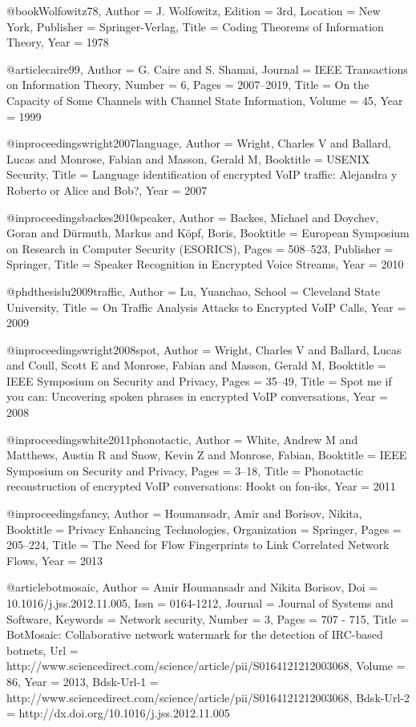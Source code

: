 {{{{{{{{{@book{Wolfowitz78,
	Author = {J. Wolfowitz},
	Edition = {3rd},
	Location = {New York},
	Publisher = {Springer-Verlag},
	Title = {Coding Theorems of Information Theory},
	Year = 1978}

@article{caire99,
	Author = {G. Caire and S. Shamai},
	Journal = {IEEE Transactions on Information Theory},
	Number = {6},
	Pages = {2007--2019},
	Title = {On the Capacity of Some Channels with Channel State Information},
	Volume = {45},
	Year = {1999}}

@inproceedings{wright2007language,
	Author = {Wright, Charles V and Ballard, Lucas and Monrose, Fabian and Masson, Gerald M},
	Booktitle = {USENIX Security},
	Title = {{Language identification of encrypted VoIP traffic: Alejandra y Roberto or Alice and Bob?}},
	Year = {2007}}

@inproceedings{backes2010speaker,
	Author = {Backes, Michael and Doychev, Goran and D{\"u}rmuth, Markus and K{\"o}pf, Boris},
	Booktitle = {{European Symposium on Research in Computer Security (ESORICS)}},
	Pages = {508--523},
	Publisher = {Springer},
	Title = {{Speaker Recognition in Encrypted Voice Streams}},
	Year = {2010}}

@phdthesis{lu2009traffic,
	Author = {Lu, Yuanchao},
	School = {Cleveland State University},
	Title = {{On Traffic Analysis Attacks to Encrypted VoIP Calls}},
	Year = {2009}}

@inproceedings{wright2008spot,
	Author = {Wright, Charles V and Ballard, Lucas and Coull, Scott E and Monrose, Fabian and Masson, Gerald M},
	Booktitle = {IEEE Symposium on Security and Privacy},
	Pages = {35--49},
	Title = {Spot me if you can: Uncovering spoken phrases in encrypted VoIP conversations},
	Year = {2008}}

@inproceedings{white2011phonotactic,
	Author = {White, Andrew M and Matthews, Austin R and Snow, Kevin Z and Monrose, Fabian},
	Booktitle = {IEEE Symposium on Security and Privacy},
	Pages = {3--18},
	Title = {Phonotactic reconstruction of encrypted VoIP conversations: Hookt on fon-iks},
	Year = {2011}}

@inproceedings{fancy,
	Author = {Houmansadr, Amir and Borisov, Nikita},
	Booktitle = {Privacy Enhancing Technologies},
	Organization = {Springer},
	Pages = {205--224},
	Title = {The Need for Flow Fingerprints to Link Correlated Network Flows},
	Year = {2013}}

@article{botmosaic,
	Author = {Amir Houmansadr and Nikita Borisov},
	Doi = {10.1016/j.jss.2012.11.005},
	Issn = {0164-1212},
	Journal = {Journal of Systems and Software},
	Keywords = {Network security},
	Number = {3},
	Pages = {707 - 715},
	Title = {BotMosaic: Collaborative network watermark for the detection of IRC-based botnets},
	Url = {http://www.sciencedirect.com/science/article/pii/S0164121212003068},
	Volume = {86},
	Year = {2013},
	Bdsk-Url-1 = {http://www.sciencedirect.com/science/article/pii/S0164121212003068},
	Bdsk-Url-2 = {http://dx.doi.org/10.1016/j.jss.2012.11.005}}

}}}}}}}}}
